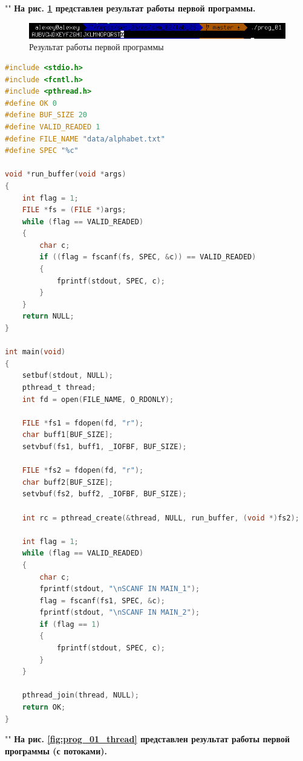\documentclass[12pt]{report}
\begin{document}
""\newline
\textbf{На рис. \ref{fig:prog_01} представлен результат работы первой программы.}

\begin{figure}[H]
	\centering
	\includegraphics[scale=0.85]{img/prog_01.png}
	\caption{Результат работы первой программы}
	\label{fig:prog_01}
\end{figure}

\begin{lstlisting}[language=c, label=p1thread, caption=Программа №1 (реализация с потоками)]
#include <stdio.h>
#include <fcntl.h>
#include <pthread.h>
#define OK 0
#define BUF_SIZE 20
#define VALID_READED 1
#define FILE_NAME "data/alphabet.txt"
#define SPEC "%c"

void *run_buffer(void *args)
{
	int flag = 1;
	FILE *fs = (FILE *)args;
	while (flag == VALID_READED)
	{
		char c;
		if ((flag = fscanf(fs, SPEC, &c)) == VALID_READED)
		{
			fprintf(stdout, SPEC, c);
		}
	}
	return NULL;
}

int main(void)
{
	setbuf(stdout, NULL);
	pthread_t thread;
	int fd = open(FILE_NAME, O_RDONLY);
	
	FILE *fs1 = fdopen(fd, "r");
	char buff1[BUF_SIZE];
	setvbuf(fs1, buff1, _IOFBF, BUF_SIZE);
	
	FILE *fs2 = fdopen(fd, "r");
	char buff2[BUF_SIZE];
	setvbuf(fs2, buff2, _IOFBF, BUF_SIZE);
	
	int rc = pthread_create(&thread, NULL, run_buffer, (void *)fs2);
	
	int flag = 1;
	while (flag == VALID_READED)
	{
		char c;
		fprintf(stdout, "\nSCANF IN MAIN_1");
		flag = fscanf(fs1, SPEC, &c);
		fprintf(stdout, "\nSCANF IN MAIN_2");
		if (flag == 1)
		{
			fprintf(stdout, SPEC, c);
		}
	}
	
	pthread_join(thread, NULL);
	return OK;
}
\end{lstlisting}

""\newline
\textbf{На рис. \ref{fig:prog_01_thread} представлен результат работы первой программы (с потоками).}
\end{document}
